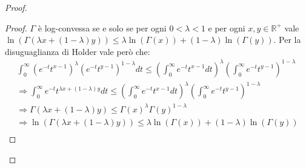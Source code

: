 \begin{proof}
\begin{proof}
       $\Gamma$ è log-convessa se e solo se per ogni $0<\lambda < 1$ e per ogni $x,y \in \mathbb{R}^+$ vale 
       $\ln(\Gamma(\lambda x+(1-\lambda)y))\le \lambda \ln(\Gamma(x))+(1-\lambda)\ln(\Gamma(y))$.
       Per la disuguaglianza di Holder vale però che:
       \begin{gather*}
       \int_0^{\infty}{(e^{-t}t^{x-1})^\lambda (e^{-t}t^{y-1})^{1-\lambda}dt} \le 
       \left(\int_0^{\infty}{e^{-t}t^{x-1}dt}\right)^\lambda \left(\int_0^{\infty}{e^{-t}t^{y-1}}\right)^{1-\lambda}\\
       \Longrightarrow \int_0^{\infty}{e^{-t}t^{\lambda x +(1-\lambda)y}dt} \le 
       \left(\int_0^{\infty}{e^{-t}t^{x-1}dt}\right)^\lambda \left(\int_0^{\infty}{e^{-t}t^{y-1}}\right)^{1-\lambda}\\
       \Longrightarrow \Gamma(\lambda x+(1-\lambda)y) \le \Gamma(x)^\lambda\Gamma(y)^{1-\lambda}\\
       \Longrightarrow \ln(\Gamma(\lambda x+(1-\lambda)y)) \le \lambda\ln(\Gamma(x))+(1-\lambda)\ln(\Gamma(y))\\
       \end{gather*}
\end{proof}
\end{proof}
